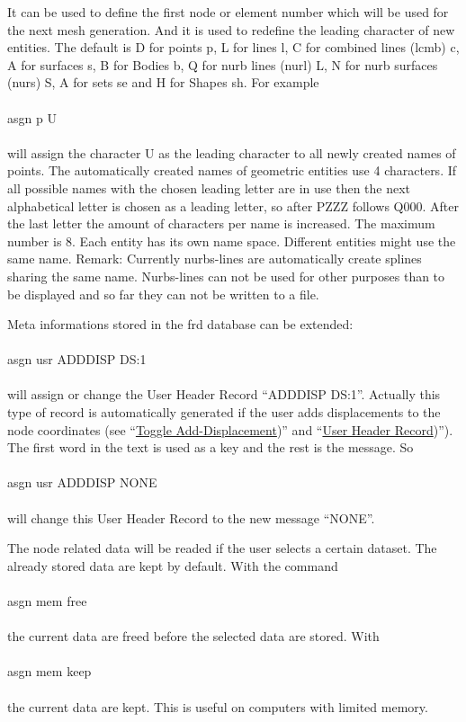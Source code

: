 \documentclass{article}
\providecommand{\htmlref}[2]{\hyperref[#2]{#1}}
\begin{document}
It can be used to define the first node or element number which will be used for the next mesh generation. And it is used to redefine the leading character of new entities. The default is D for points p, L for lines l, C for combined lines (lcmb) c, A for surfaces s, B for Bodies b, Q for nurb lines (nurl) L, N for nurb surfaces (nurs) S, A for sets se and H for Shapes sh. For example\\\\asgn p U\\\\will assign the character U as the leading character to all newly created names of points. The automatically created names of geometric entities use 4 characters. If all possible names with the chosen leading letter are in use then the next alphabetical letter is chosen as a leading letter, so after PZZZ follows Q000. After the last letter the amount of characters per name is increased. The maximum number is 8. Each entity has its own name space. Different entities might use the same name. Remark: Currently nurbs-lines are automatically create splines sharing the same name. Nurbs-lines can not be used for other purposes than to be displayed and so far they can not be written to a file.

Meta informations stored in the frd database can be extended:\\\\asgn usr ADDDISP DS:1\\\\will assign or change the User Header Record ``ADDDISP DS:1''. Actually this type of record is automatically generated if the user adds displacements to the node coordinates (see ``\htmlref{Toggle Add-Displacement}{Toggle Add-Displacement})'' and ``\htmlref{User Header Record}{User Header Record})''). The first word in the text is used as a key and the rest is the message. So \\\\asgn usr ADDDISP NONE\\\\will change this User Header Record to the new message ``NONE''.

The node related data will be readed if the user selects a certain dataset. The already stored data are kept by default. With the command\\\\asgn mem free\\\\the current data are freed before the selected data are stored. With \\\\asgn mem keep\\\\the current data are kept. This is useful on computers with limited memory.
\end{document}
